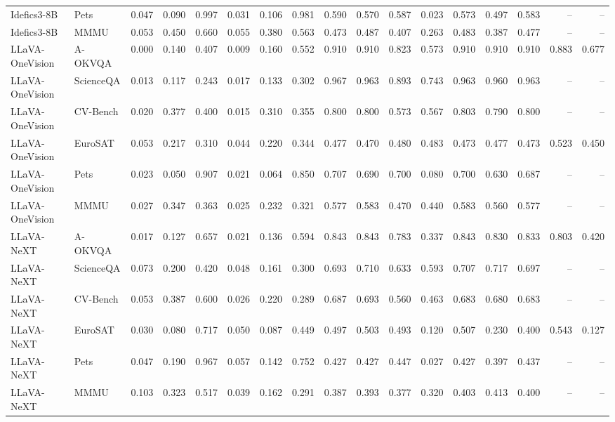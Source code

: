 \begin{tabular}{llrrrrrr rrrr rrrrr}
Idefics3-8B & Pets & 0.047 & 0.090 & 0.997 & 0.031 & 0.106 & 0.981 & 0.590 & 0.570 & 0.587 & 0.023 & 0.573 & 0.497 & 0.583 & -- & -- \\
Idefics3-8B & MMMU & 0.053 & 0.450 & 0.660 & 0.055 & 0.380 & 0.563 & 0.473 & 0.487 & 0.407 & 0.263 & 0.483 & 0.387 & 0.477 & -- & -- \\
LLaVA-OneVision & A-OKVQA & 0.000 & 0.140 & 0.407 & 0.009 & 0.160 & 0.552 & 0.910 & 0.910 & 0.823 & 0.573 & 0.910 & 0.910 & 0.910 & 0.883 & 0.677 \\
LLaVA-OneVision & ScienceQA & 0.013 & 0.117 & 0.243 & 0.017 & 0.133 & 0.302 & 0.967 & 0.963 & 0.893 & 0.743 & 0.963 & 0.960 & 0.963 & -- & -- \\
LLaVA-OneVision & CV-Bench & 0.020 & 0.377 & 0.400 & 0.015 & 0.310 & 0.355 & 0.800 & 0.800 & 0.573 & 0.567 & 0.803 & 0.790 & 0.800 & -- & -- \\
LLaVA-OneVision & EuroSAT & 0.053 & 0.217 & 0.310 & 0.044 & 0.220 & 0.344 & 0.477 & 0.470 & 0.480 & 0.483 & 0.473 & 0.477 & 0.473 & 0.523 & 0.450 \\
LLaVA-OneVision & Pets & 0.023 & 0.050 & 0.907 & 0.021 & 0.064 & 0.850 & 0.707 & 0.690 & 0.700 & 0.080 & 0.700 & 0.630 & 0.687 & -- & -- \\
LLaVA-OneVision & MMMU & 0.027 & 0.347 & 0.363 & 0.025 & 0.232 & 0.321 & 0.577 & 0.583 & 0.470 & 0.440 & 0.583 & 0.560 & 0.577 & -- & -- \\
LLaVA-NeXT & A-OKVQA & 0.017 & 0.127 & 0.657 & 0.021 & 0.136 & 0.594 & 0.843 & 0.843 & 0.783 & 0.337 & 0.843 & 0.830 & 0.833 & 0.803 & 0.420 \\
LLaVA-NeXT & ScienceQA & 0.073 & 0.200 & 0.420 & 0.048 & 0.161 & 0.300 & 0.693 & 0.710 & 0.633 & 0.593 & 0.707 & 0.717 & 0.697 & -- & -- \\
LLaVA-NeXT & CV-Bench & 0.053 & 0.387 & 0.600 & 0.026 & 0.220 & 0.289 & 0.687 & 0.693 & 0.560 & 0.463 & 0.683 & 0.680 & 0.683 & -- & -- \\
LLaVA-NeXT & EuroSAT & 0.030 & 0.080 & 0.717 & 0.050 & 0.087 & 0.449 & 0.497 & 0.503 & 0.493 & 0.120 & 0.507 & 0.230 & 0.400 & 0.543 & 0.127 \\
LLaVA-NeXT & Pets & 0.047 & 0.190 & 0.967 & 0.057 & 0.142 & 0.752 & 0.427 & 0.427 & 0.447 & 0.027 & 0.427 & 0.397 & 0.437 & -- & -- \\
LLaVA-NeXT & MMMU & 0.103 & 0.323 & 0.517 & 0.039 & 0.162 & 0.291 & 0.387 & 0.393 & 0.377 & 0.320 & 0.403 & 0.413 & 0.400 & -- & -- \\
\bottomrule
\end{tabular}
